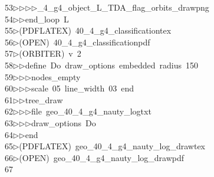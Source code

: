 \begin{tabbing}
53\>$\triangleright$\>$\triangleright$\>$\triangleright$\>$\triangleright$\_4\_g4\_object\_L\_TDA\_flag\_orbits\_drawpng\ \\[0pt]
54\>$\triangleright$\>$\triangleright$\>end\_loop\ L\\[0pt]
55\>$\triangleright$\>(PDFLATEX)\ 40\_4\_g4\_classificationtex\\[0pt]
56\>$\triangleright$\>(OPEN)\ 40\_4\_g4\_classificationpdf\\[0pt]
57\>$\triangleright$\>(ORBITER)\ v\ 2\ \\[0pt]
58\>$\triangleright$\>$\triangleright$\>define\ Do\ draw\_options\ embedded\ radius\ 150\ \\[0pt]
59\>$\triangleright$\>$\triangleright$\>$\triangleright$\>nodes\_empty\ \\[0pt]
60\>$\triangleright$\>$\triangleright$\>$\triangleright$\>scale\ 05\ line\_width\ 03\ end\ \\[0pt]
61\>$\triangleright$\>$\triangleright$\>tree\_draw\ \\[0pt]
62\>$\triangleright$\>$\triangleright$\>$\triangleright$\>file\ geo\_40\_4\_g4\_nauty\_logtxt\ \\[0pt]
63\>$\triangleright$\>$\triangleright$\>$\triangleright$\>draw\_options\ Do\ \\[0pt]
64\>$\triangleright$\>$\triangleright$\>end\\[0pt]
65\>$\triangleright$\>(PDFLATEX)\ geo\_40\_4\_g4\_nauty\_log\_drawtex\\[0pt]
66\>$\triangleright$\>(OPEN)\ geo\_40\_4\_g4\_nauty\_log\_drawpdf\\[0pt]
67\>\end{tabbing}
